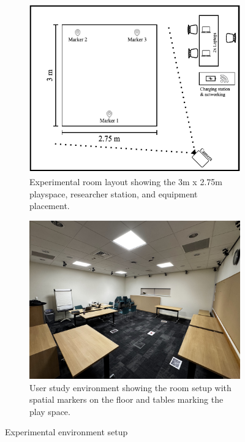 \begin{figure}[htbp]
    \centering
    \begin{subfigure}[b]{0.48\textwidth}
        \centering
        \includegraphics[width=\textwidth]{assets/05/room-layout.pdf}
        \caption{Experimental room layout showing the 3m x 2.75m playspace, researcher station, and equipment placement.}
        \label{fig:room-layout}
    \end{subfigure}
    \hfill
    \begin{subfigure}[b]{0.48\textwidth}
        \centering
        \includegraphics[width=\textwidth]{assets/05/user-study-room.jpg}
        \caption{User study environment showing the room setup with spatial markers on the floor and tables marking the play space.}
        \label{fig:user-study-room}
    \end{subfigure}
    \caption{Experimental environment setup}
    \label{fig:experimental-environment}
\end{figure}

